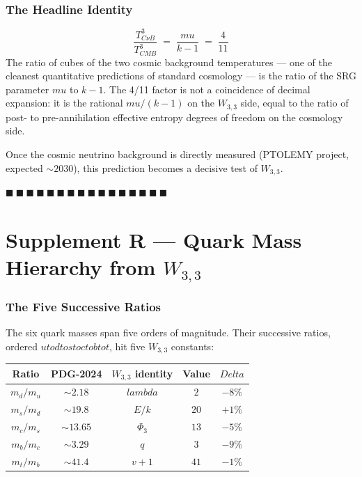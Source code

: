 \documentclass[12pt,a4paper]{article}
\def\textbf#1{#1}%
\def\Delta{Delta}%
\def\lambda{lambda}%
\def\mu{mu}%
\def\Phi#1{Phi#1}%
\def\to{ to }%
\theoremstyle{definition}
\begin{document}
\section*{The Headline Identity}
\[
\boxed{\;\frac{T_{C\nu B}^3}{T_{CMB}^3} \;=\; \frac{\mu}{k-1} \;=\; \frac{4}{11}\;}
\]
The ratio of cubes of the two cosmic background temperatures — one of
the cleanest quantitative predictions of standard cosmology — is the
ratio of the SRG parameter $\mu$ to $k-1$. The 4/11 factor is not a
coincidence of decimal expansion: it is the rational
$\mu/(k-1)$ on the $W_{3,3}$ side, equal to the ratio of post- to
pre-annihilation effective entropy degrees of freedom on the
cosmology side.

Once the cosmic neutrino background is directly measured (PTOLEMY
project, expected $\sim 2030$), this prediction becomes a
\textbf{decisive test} of $W_{3,3}$.

\hfill $\blacksquare\ \blacksquare\ \blacksquare\ \blacksquare\ \blacksquare\ \blacksquare\ \blacksquare\ \blacksquare\ \blacksquare\ \blacksquare\ \blacksquare\ \blacksquare\ \blacksquare\ \blacksquare\ \blacksquare\ \blacksquare$

\clearpage
\part*{Supplement R --- Quark Mass Hierarchy from $W_{3,3}$}

\section*{The Five Successive Ratios}

The six quark masses span five orders of magnitude. Their successive
ratios, ordered $u\to d\to s\to c\to b\to t$, hit five $W_{3,3}$
constants:

\begin{center}
\renewcommand{\arraystretch}{1.3}
\begin{tabular}{ccccc}
\toprule
Ratio & PDG-2024 & $W_{3,3}$ identity & Value & $\Delta$ \\
\midrule
$m_d/m_u$ & $\sim 2.18$ & $\lambda$            &   $2$ &  $-8\%$ \\
$m_s/m_d$ & $\sim 19.8$ & $E/k$                &  $20$ &  $+1\%$ \\
$m_c/m_s$ & $\sim 13.65$ & $\Phi_3$            &  $13$ &  $-5\%$ \\
$m_b/m_c$ & $\sim 3.29$ & $q$                  &   $3$ &  $-9\%$ \\
$m_t/m_b$ & $\sim 41.4$ & $v+1$                &  $41$ &  $-1\%$ \\
\bottomrule
\end{tabular}
\end{center}
\end{document}
